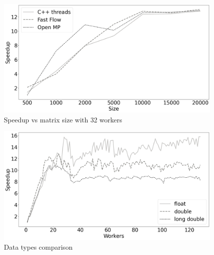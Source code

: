 \documentclass[12pt]{article}
\begin{document}
	\begin{figure}[H]
		\centering
		\includegraphics[width=13cm]{./images/speedup_vs_size}
		\caption{Speedup vs matrix size with 32 workers}
	\end{figure}

	\begin{figure}[H]
		\centering
		\includegraphics[width=13cm]{./images/data_types_speedup}
		\caption{Data types comparison}
	\end{figure}
\end{document}
